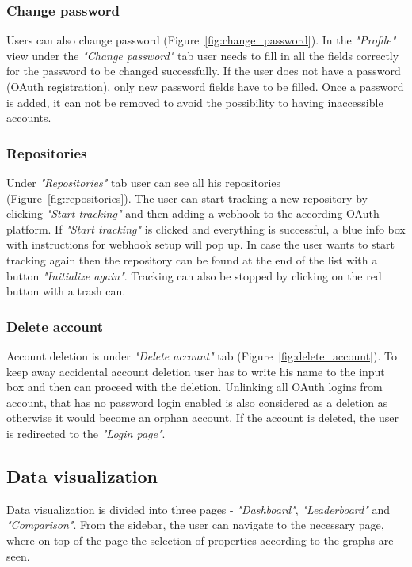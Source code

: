 \subsubsection{Change password}\label{subsubsec:change-password}
Users can also change password (Figure~\ref{fig:change_password}).
In the \textit{"Profile"} view under the \textit{"Change password"} tab user needs to fill in all the fields correctly for the password to be changed successfully.
If the user does not have a password (OAuth registration), only new password fields have to be filled.
Once a password is added, it can not be removed to avoid the possibility to having inaccessible accounts.

\subsubsection{Repositories}\label{subsubsec:repositories}
Under \textit{"Repositories"} tab user can see all his repositories (Figure~\ref{fig:repositories}).
The user can start tracking a new repository by clicking \textit{"Start tracking"} and then adding a webhook to the according OAuth platform.
If \textit{"Start tracking"} is clicked and everything is successful, a blue info box with instructions for webhook setup will pop up.
In case the user wants to start tracking again then the repository can be found at the end of the list with a button \textit{"Initialize again"}.
Tracking can also be stopped by clicking on the red button with a trash can.

\subsubsection{Delete account}\label{subsubsec:delete-account}
Account deletion is under \textit{"Delete account"} tab (Figure~\ref{fig:delete_account}).
To keep away accidental account deletion user has to write his name to the input box and then can proceed with the deletion.
Unlinking all OAuth logins from account, that has no password login enabled is also considered as a deletion as otherwise it would become
an orphan account.
If the account is deleted, the user is redirected to the \textit{"Login page"}.

\subsection{Data visualization}\label{subsec:data-visualization}
Data visualization is divided into three pages - \textit{"Dashboard"}, \textit{"Leaderboard"} and \textit{"Comparison"}.
From the sidebar, the user can navigate to the necessary page, where on top of the page the selection of properties according to the graphs are seen.

